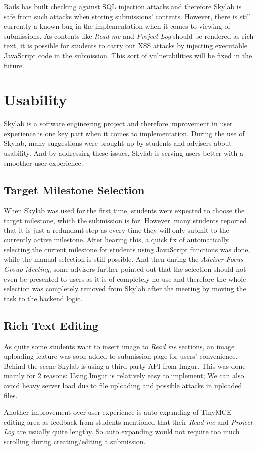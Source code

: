 Rails has built checking against SQL injection attacks and therefore Skylab is safe from such attacks when storing submissions' contents\cite{citation11}. However, there is still currently a known bug in the implementation when it comes to viewing of submissions. As contents like \textit{Read me} and \textit{Project Log} should be rendered as rich text, it is possible for students to carry out XSS attacks by injecting executable JavaScript code in the submission. This sort of vulnerabilities will be fixed in the future.

\section{Usability}

Skylab is a software engineering project and therefore improvement in user experience is one key part when it comes to implementation. During the use of Skylab, many suggestions were brought up by students and advisers about usability. And by addressing these issues, Skylab is serving users better with a smoother user experience.

\subsection{Target Milestone Selection}

When Skylab was used for the first time, students were expected to choose the target milestone, which the submission is for. However, many students reported that it is just a redundant step as every time they will only submit to the currently active milestone. After hearing this, a quick fix of automatically selecting the current milestone for students using JavaScript functions was done, while the manual selection is still possible. And then during the \textit{Adviser Focus Group Meeting}, some advisers further pointed out that the selection should not even be presented to users as it is of completely no use and therefore the whole selection was completely removed from Skylab after the meeting by moving the task to the backend logic. 

\subsection{Rich Text Editing}

As quite some students want to insert image to \textit{Read me} sections, an image uploading feature was soon added to submission page for users' convenience. Behind the scene Skylab is using a third-party API from Imgur. This was done mainly for 2 reasons: Using Imgur is relatively easy to implement; We can also avoid heavy server load due to file uploading and possible attacks in uploaded files.

Another improvement over user experience is auto expanding of TinyMCE editing area as feedback from students mentioned that their \textit{Read me} and \textit{Project Log} are usually quite lengthy. So auto expanding would not require too much scrolling during creating/editing a submission.
